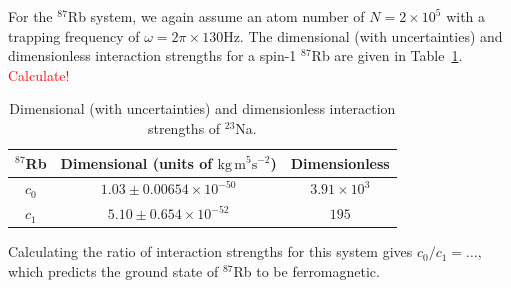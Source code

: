 For the \( ^{87}\)Rb system, we again assume an atom number of
\(N = 2\times 10^5\) with a trapping frequency of
\(\omega = 2\pi \times 130\)Hz.
The dimensional (with uncertainties) and dimensionless interaction strengths
for a spin-1 \( ^{87}\)Rb are given in
Table~\ref{table: spin-1-interactions-rb87}.
\textcolor{red}{Calculate!}
\begin{table}[!htbp]
    \centering
    \begin{tabular}{ccc}
        \toprule
        \( ^{87}\)Rb & Dimensional (units of \(\text{kg}\, \text{m}^5
        \text{s}^{-2}\)) & Dimensionless \\
        \midrule
        \(c_0\) & \(1.03 \pm 0.00654 \times 10^{-50}\) & \(3.91\times10^3\) \\
        \(c_1\) & \(5.10 \pm 0.654 \times 10^{-52}\) & \(195\) \\
        \bottomrule
    \end{tabular}
    \caption{\label{table: spin-1-interactions-rb87}Dimensional (with
    uncertainties) and dimensionless interaction strengths of \( ^{23}\)Na.}
\end{table}
Calculating the ratio of interaction strengths for this system gives
\(c_0/c_1=\ldots \), which predicts the ground state of \( ^{87}\)Rb to be
ferromagnetic.

